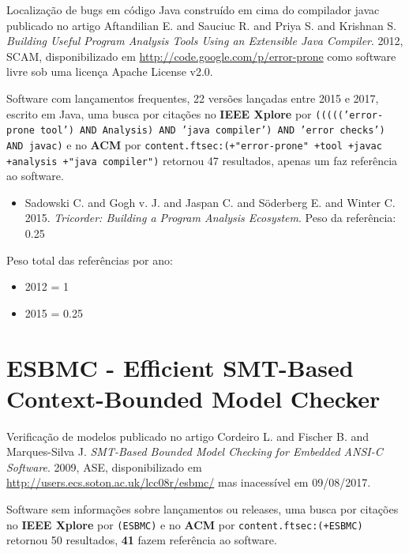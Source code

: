 Localização de bugs em código Java construído em cima do compilador javac
publicado no artigo
Aftandilian E. and Sauciuc R. and Priya S. and Krishnan S.
{\it Building Useful Program Analysis Tools Using an Extensible Java Compiler}.
2012,
SCAM,
disponibilizado em \url{http://code.google.com/p/error-prone}
como software livre
sob uma licença Apache License v2.0.

Software com lançamentos frequentes,
22 versões lançadas
entre 2015 e 2017,
escrito em Java,
uma busca por citações no {\bf IEEE Xplore} por
\texttt{((((('error-prone tool') AND Analysis) AND 'java compiler') AND 'error checks') AND javac)}
e no {\bf ACM} por
\texttt{content.ftsec:(+"error-prone" +tool +javac +analysis +"java compiler")}
retornou
47 resultados,
apenas um faz referência ao software.

\begin{itemize}
\item Sadowski C. and Gogh v. J. and Jaspan C. and Söderberg E. and Winter C.
      2015.
      {\it Tricorder: Building a Program Analysis Ecosystem}.
      Peso da referência: 0.25
\end{itemize}

Peso total das referências por ano:

\begin{itemize}
\item 2012 = 1
\item 2015 = 0.25
\end{itemize}


\section{ESBMC - Efficient SMT-Based Context-Bounded Model Checker}

Verificação de modelos
publicado no artigo
Cordeiro L. and Fischer B. and Marques-Silva J.
{\it SMT-Based Bounded Model Checking for Embedded ANSI-C Software}.
2009,
ASE,
disponibilizado em \url{http://users.ecs.soton.ac.uk/lcc08r/esbmc/}
mas inacessível em 09/08/2017.

Software sem informações sobre lançamentos ou releases,
uma busca por citações no {\bf IEEE Xplore} por
\texttt{(ESBMC)}
e no {\bf ACM} por
\texttt{content.ftsec:(+ESBMC)}
retornou
50 resultados,
{\bf 41} fazem referência ao software.

